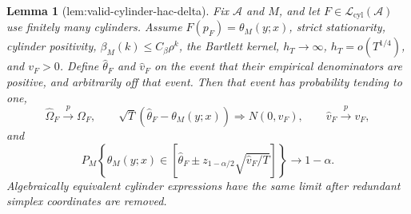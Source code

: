 \documentclass{article}
\newtheorem{lemma}{Lemma}
\begin{document}
\begin{lemma}[lem:valid-cylinder-hac-delta]\label{lem:valid-cylinder-hac-delta}
Fix \(\mathcal A\) and \(M\), and let \(F\in\mathcal L_{\mathrm{cyl}}(\mathcal A)\) use finitely many cylinders.  Assume \(F(p_F)=\theta_M(y;x)\), strict stationarity, cylinder positivity, \(\beta_M(k)\le C_\beta\rho^k\), the Bartlett kernel, \(h_T\to\infty\), \(h_T=o(T^{1/4})\), and \(v_F>0\).  Define \(\widehat\theta_F\) and \(\widehat v_F\) on the event that their empirical denominators are positive, and arbitrarily off that event.  Then that event has probability tending to one,
\[
 \widehat\Omega_F\overset p\longrightarrow\Omega_F,\qquad
 \sqrt T(\widehat\theta_F-\theta_M(y;x))\Rightarrow N(0,v_F),\qquad
 \widehat v_F\overset p\longrightarrow v_F,
\]
and
\[
 P_M\!\left\{\theta_M(y;x)\in
 \left[\widehat\theta_F\pm z_{1-\alpha/2}\sqrt{\widehat v_F/T}\right]\right\}
 \longrightarrow1-\alpha.
\]
Algebraically equivalent cylinder expressions have the same limit after redundant simplex coordinates are removed.
\end{lemma}
\end{document}
